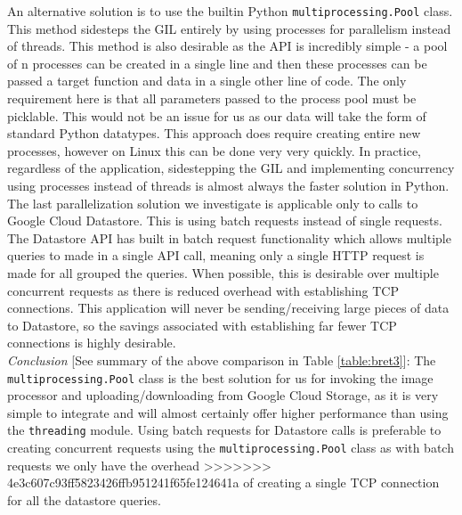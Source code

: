 \documentclass[10pt, onecolumn, draftclsnofoot, letterpaper, compsoc]{IEEEtran}
\begin{document}
An alternative solution is to use the builtin Python {\tt multiprocessing.Pool}
class. This method sidesteps the GIL entirely by using processes for
parallelism instead of threads\cite{multiproc}. This method is also desirable
as the API is incredibly simple - a pool of n processes can be created in a
single line and then these processes can be passed a target function and
data in a single other line of code\cite{multiproc}. The only requirement
here is that all parameters passed to the process pool must be picklable\cite{multiproc}.
This would not be an issue for us as our data will take the form of standard
Python datatypes. This approach does require creating entire new processes,
however on Linux this can be done very very quickly. In practice, regardless
of the application, sidestepping the GIL and implementing concurrency using
processes instead of threads is almost always the faster solution in Python. \\

The last parallelization solution we investigate is applicable only to calls to
Google Cloud Datastore. This is using batch requests instead of single requests.
The Datastore API has built in batch request functionality which allows multiple
queries to made in a single API call, meaning only a single HTTP request is made
for all grouped the queries\cite{batches}. When possible, this is desirable over
multiple concurrent requests as there is reduced overhead with establishing
TCP connections. This application will never be sending/receiving large
pieces of data to Datastore, so the savings associated with establishing
far fewer TCP connections is highly desirable. \\

\textit{Conclusion} [See summary of the above comparison in Table \ref{table:bret3}]:
The {\tt multiprocessing.Pool} class is the best solution for us
for invoking the image processor and uploading/downloading from Google Cloud
Storage, as it is very simple to integrate and will almost certainly offer
higher performance than using the {\tt threading} module. Using batch requests for
Datastore calls is preferable to creating concurrent requests using the
{\tt multiprocessing.Pool} class as with batch requests we only have the overhead
>>>>>>> 4e3c607c93ff5823426ffb951241f65fe124641a
of creating a single TCP connection for all the datastore queries. \\
\end{document}
